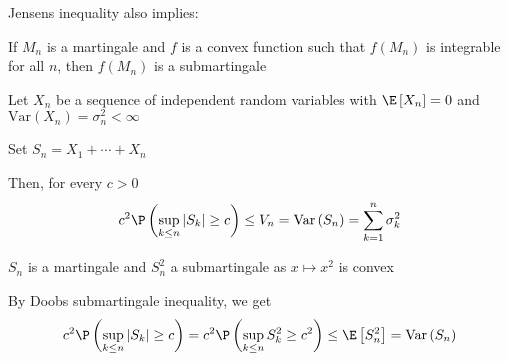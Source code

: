 \par\bigskip
\noindent Jensens inequality also implies:
\par\bigskip
\begin{lem}[]{}
  If $M_n$ is a martingale and $f$ is a convex function such that $f(M_n)$ is integrable for all $n$, then $f(M_n)$ is a submartingale
\end{lem}
\par\bigskip
\begin{theo}{}
  Let $X_n$ be a sequence of independent random variables with $\E\left[X_n\right] = 0$ and $\text{Var}\left(X_n\right) = \sigma_n^2<\infty$\par
  \noindent Set $S_n =X_1+\cdots+X_n$
  \par\bigskip
  \noindent Then, for every $c>0$
  \begin{equation*}
    \begin{gathered}
      c^2\P\left(\sup_{k\leq n}\left|S_k\right|\geq c\right)\leq V_n = \text{Var}\left(S_n\right) = \sum_{k=1}^{n}\sigma_k^2
    \end{gathered}
  \end{equation*}
\end{theo}
\par\bigskip
\begin{prf}[]{}
  $S_n$ is a martingale and $S_n^2$ a submartingale as $x\mapsto x^2$ is convex
  \par\bigskip
  \noindent By Doobs submartingale inequality, we get
  \begin{equation*}
    \begin{gathered}
      c^2\P\left(\sup_{k\leq n}\left|S_k\right|\geq c\right) = c^2\P\left(\sup_{k\leq n}S_k^2\geq c^2\right)\leq \E\left[S_n^2\right] = \text{Var}\left(S_n\right)
    \end{gathered}
  \end{equation*}
\end{prf}
